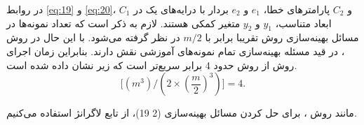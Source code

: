 \bigbreak
در روابط \ref{eq:19} و \ref{eq:20}،  $C_1$ و $C_2$  پارامترهای خطا،  $e_1$ و  $e_2$ بردار با درایه‌های یک در ابعاد متناسب،  $y_1$ و $y_2$  متغیر کمکی هستند. لازم به ذکر است که تعداد نمونه‌ها در مسائل بهینه‌سازی روش  تقریبا برابر با $m/2$ در نظر گرفته می‌شود. با این حال در روش ، در قید مسئله بهینه‌سازی تمام نمونه‌های آموزشی نقش دارند. بنابراین زمان اجرای روش  از روش  حدود 4 برابر سریع‌تر است که زیر نشان داده شده است.
\begin{equation}
\Big[({{m}^{3}})/(2\times {{(\frac{m}{2})}^{3}})\Big] = 4.
\label{eq:21}
\end{equation}

مانند روش ، برای حل کردن مسائل بهینه‌سازی (‏2 19)، از تابع لاگرانژ استفاده می‌کنیم.